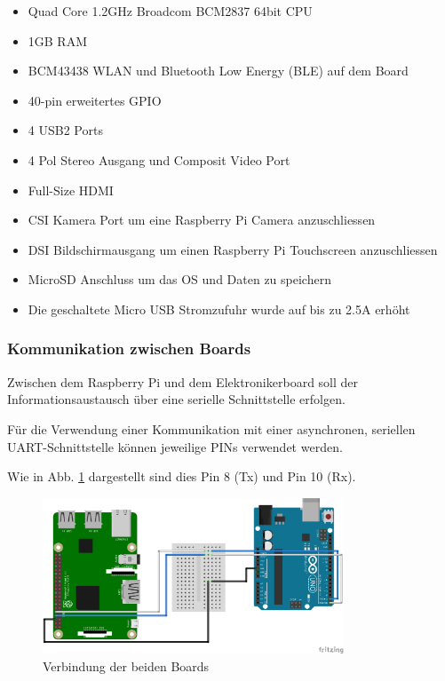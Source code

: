 \documentclass[a4paper]{report}
\begin{document}
\begin{itemize}[noitemsep]
	\item Quad Core 1.2GHz Broadcom BCM2837 64bit CPU
	\item 1GB RAM
	\item BCM43438 WLAN und Bluetooth Low Energy (BLE) auf dem Board
	\item 40-pin erweitertes GPIO
	\item 4 USB2 Ports
	\item 4 Pol Stereo Ausgang und Composit Video Port
	\item Full-Size HDMI
	\item CSI Kamera Port um eine Raspberry Pi Camera anzuschliessen
	\item DSI Bildschirmausgang um einen Raspberry Pi Touchscreen anzuschliessen
	\item MicroSD Anschluss um das OS und Daten zu speichern
	\item Die geschaltete Micro USB Stromzufuhr wurde auf bis zu 2.5A erhöht
\end{itemize}\parencite{RaspberryPiFoundation2017}

\vspace{1em}

\subsubsection{Kommunikation zwischen Boards}
\label{ssec:Kommunikation}
Zwischen dem Raspberry Pi und dem Elektronikerboard soll der Informationsaustausch über eine serielle Schnittstelle erfolgen.

Für die Verwendung einer Kommunikation mit einer asynchronen, seriellen UART-Schnittstelle können jeweilige PINs verwendet werden.

Wie in Abb. \ref{fig:RaspberryPins} dargestellt sind dies Pin 8 (Tx) und Pin 10 (Rx).
\begin{figure}[h!]
	\centering
	\includegraphics[keepaspectratio, width=0.8\textwidth]{UART_Verbindung_LLS_Steckplatine}
	\caption{Verbindung der beiden Boards}
	\label{fig:RaspberryPins}
\end{figure}
\end{document}
